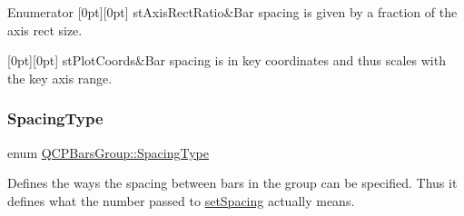 \begin{DoxyEnumFields}{Enumerator}
[0pt][0pt]{}\mbox{\label{class_q_c_p_bars_group_a4c0521120a97e60bbca37677a37075b6a7b43366bb86f2ea96acb884f107c4728}} 
st\+Axis\+Rect\+Ratio&Bar spacing is given by a fraction of the axis rect size. \\
\hline

[0pt][0pt]{}\mbox{\label{class_q_c_p_bars_group_a4c0521120a97e60bbca37677a37075b6a73baa3f808dc74956073b8bb2eec391d}} 
st\+Plot\+Coords&Bar spacing is in key coordinates and thus scales with the key axis range. \\
\hline

\end{DoxyEnumFields}
\mbox{\label{class_q_c_p_bars_group_a4c0521120a97e60bbca37677a37075b6}} 
\subsubsection{\texorpdfstring{Spacing\+Type}{SpacingType}\hspace{0.1cm}{\footnotesize\ttfamily [2/2]}}
{\footnotesize\ttfamily enum \hyperlink{class_q_c_p_bars_group_a4c0521120a97e60bbca37677a37075b6}{Q\+C\+P\+Bars\+Group\+::\+Spacing\+Type}}

Defines the ways the spacing between bars in the group can be specified. Thus it defines what the number passed to \hyperlink{class_q_c_p_bars_group_aa553d327479d72a0c3dafcc724a190e2}{set\+Spacing} actually means.

